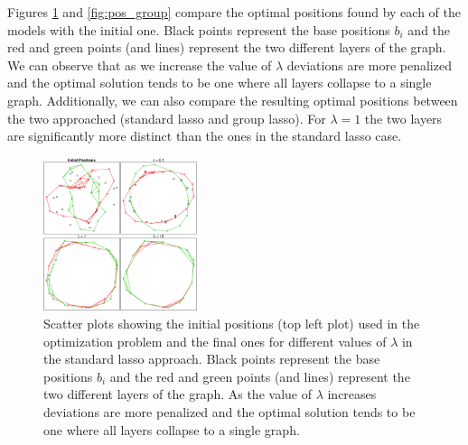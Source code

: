 \documentclass{article}
\begin{document}
Figures \ref{fig:pos_lasso} and \ref{fig:pos_group} compare the optimal positions found by each of the models with the initial one. Black points represent the base positions $b_i$ and the red and green points (and lines) represent the two different layers of the graph. We can observe that as we increase the value of $\lambda$ deviations are more penalized and the optimal solution tends to be one where all layers collapse to a single graph. Additionally, we can also compare the resulting optimal positions between the two approached (standard lasso and group lasso). For $\lambda=1$ the two layers are significantly more distinct than the ones in the standard lasso case.

\begin{figure}[h!]
   \centering
   \includegraphics[width=0.4\textwidth]{plot_positions_individual} %
   \caption{Scatter plots showing the initial positions (top left plot) used in the optimization problem and the final ones for different values of $\lambda$ in the standard lasso approach. Black points represent the base positions $b_i$ and the red and green points (and lines) represent the two different layers of the graph. As the value of $\lambda$ increases deviations are more penalized and the optimal solution tends to be one where all layers collapse to a single graph.}
   \label{fig:pos_lasso}
\end{figure}
%
\end{document}
